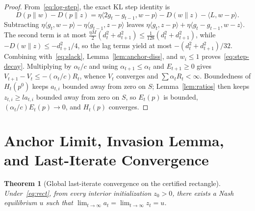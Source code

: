 \documentclass[11pt]{article}
\theoremstyle{plain}
\newtheorem{theorem}{Theorem}
\theoremstyle{definition}
\theoremstyle{remark}
\begin{document}
\begin{proof}
From~\eqref{eq:log-step}, the exact KL step identity is
\[
D(p \| w) - D(p \| z) = \eta\langle 2g_t - g_{t-1}, w - p \rangle - D(w \| z) - \langle L, w - p \rangle.
\]
Subtracting $\eta\langle g_t, w - p\rangle - \eta\langle g_{t-1}, z - p\rangle$ leaves $\eta\langle g_t, z - p\rangle + \eta\langle g_t - g_{t-1}, w - z\rangle$. The second term is at most $\frac{\eta M}{2}(d_t^2 + d_{t+1}^2) \le \frac{1}{128}(d_t^2 + d_{t+1}^2)$, while $-D(w \| z) \le -d_{t+1}^2/4$, so the lag terms yield at most $-(d_t^2 + d_{t+1}^2)/32$. Combining with~\eqref{eq:slack}, Lemma~\ref{lem:anchor-diss}, and $w_i \le 1$ proves~\eqref{eq:step-decay}. Multiplying by $\alpha_t/c$ and using $\alpha_{t+1} \le \alpha_t$ and $E_{t+1} \ge 0$ gives $V_{t+1} - V_t \le -(\alpha_t/c) R_t$, whence $V_t$ converges and $\sum \alpha_t R_t < \infty$. Boundedness of $H_t(p^0)$ keeps $a_{t,i}$ bounded away from zero on $S$; Lemma~\ref{lem:ratios} then keeps $z_{t,i} \ge l a_{t,i}$ bounded away from zero on $S$, so $E_t(p)$ is bounded, $(\alpha_t/c)E_t(p) \to 0$, and $H_t(p)$ converges.
\end{proof}

\section{Anchor Limit, Invasion Lemma, and Last-Iterate Convergence}

\begin{theorem}[Global last-iterate convergence on the certified rectangle]\label{thm:main}
Under~\eqref{eq:rect}, from every interior initialization $z_0 > 0$, there exists a Nash equilibrium $u$ such that $\lim_{t \to \infty} a_t = \lim_{t \to \infty} z_t = u$.
\end{theorem}
\end{document}
